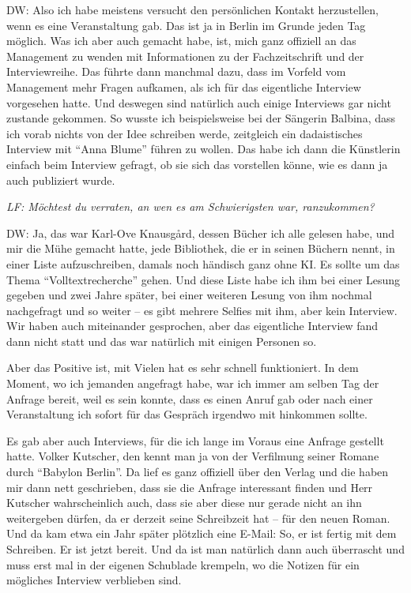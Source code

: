 \documentclass[a4paper,
fontsize=11pt,
oneside,
numbers=noperiodatend,
parskip=half-,
bibliography=totoc,
final
]{scrartcl}
\begin{document}
DW: Also ich habe meistens versucht den persönlichen Kontakt
herzustellen, wenn es eine Veranstaltung gab. Das ist ja in Berlin im
Grunde jeden Tag möglich. Was ich aber auch gemacht habe, ist, mich ganz
offiziell an das Management zu wenden mit Informationen zu der
Fachzeitschrift und der Interviewreihe. Das führte dann manchmal dazu,
dass im Vorfeld vom Management mehr Fragen aufkamen, als ich für das
eigentliche Interview vorgesehen hatte. Und deswegen sind natürlich auch
einige Interviews gar nicht zustande gekommen. So wusste ich
beispielsweise bei der Sängerin Balbina, dass ich vorab nichts von der
Idee schreiben werde, zeitgleich ein dadaistisches Interview mit
\enquote{Anna Blume} führen zu wollen. Das habe ich dann die Künstlerin
einfach beim Interview gefragt, ob sie sich das vorstellen könne, wie es
dann ja auch publiziert wurde.

\emph{LF: Möchtest du verraten, an wen es am Schwierigsten war,
ranzukommen?}

DW: Ja, das war Karl-Ove Knausgård, dessen Bücher ich alle gelesen habe,
und mir die Mühe gemacht hatte, jede Bibliothek, die er in seinen
Büchern nennt, in einer Liste aufzuschreiben, damals noch händisch ganz
ohne KI. Es sollte um das Thema \enquote{Volltextrecherche} gehen. Und
diese Liste habe ich ihm bei einer Lesung gegeben und zwei Jahre später,
bei einer weiteren Lesung von ihm nochmal nachgefragt und so weiter --
es gibt mehrere Selfies mit ihm, aber kein Interview. Wir haben auch
miteinander gesprochen, aber das eigentliche Interview fand dann nicht
statt und das war natürlich mit einigen Personen so.

Aber das Positive ist, mit Vielen hat es sehr schnell funktioniert. In
dem Moment, wo ich jemanden angefragt habe, war ich immer am selben Tag
der Anfrage bereit, weil es sein konnte, dass es einen Anruf gab oder
nach einer Veranstaltung ich sofort für das Gespräch irgendwo mit
hinkommen sollte.

Es gab aber auch Interviews, für die ich lange im Voraus eine Anfrage
gestellt hatte. Volker Kutscher, den kennt man ja von der Verfilmung
seiner Romane durch \enquote{Babylon Berlin}. Da lief es ganz offiziell
über den Verlag und die haben mir dann nett geschrieben, dass sie die
Anfrage interessant finden und Herr Kutscher wahrscheinlich auch, dass
sie aber diese nur gerade nicht an ihn weitergeben dürfen, da er derzeit
seine Schreibzeit hat -- für den neuen Roman. Und da kam etwa ein Jahr
später plötzlich eine E-Mail: So, er ist fertig mit dem Schreiben. Er
ist jetzt bereit. Und da ist man natürlich dann auch überrascht und muss
erst mal in der eigenen Schublade krempeln, wo die Notizen für ein
mögliches Interview verblieben sind.
\end{document}
